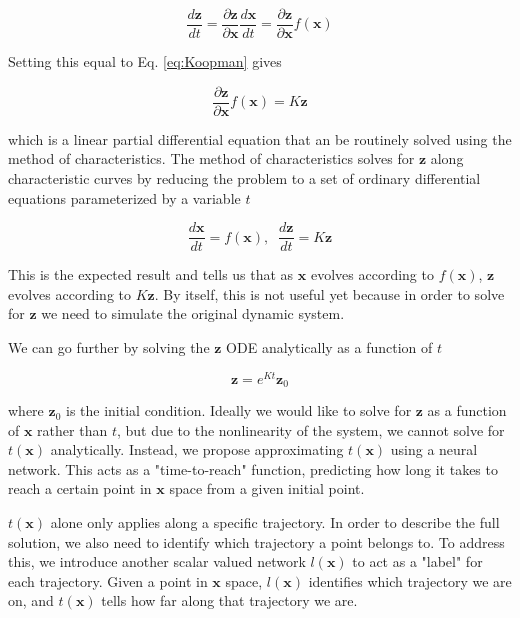 \documentclass[12pt, letterpaper]{article}
\begin{document}
\begin{equation}
    \frac{d \mathbf{z}}{dt} = \frac{\partial \mathbf{z}}{\partial \mathbf{x}} \frac{d \mathbf{x}}{dt} = \frac{\partial \mathbf{z}}{\partial \mathbf{x}} f(\mathbf{x})
\end{equation}

Setting this equal to Eq. \ref{eq:Koopman} gives

\begin{equation}
    \frac{\partial \mathbf{z}}{\partial \mathbf{x}} f(\mathbf{x}) = K \mathbf{z}
\end{equation}

which is a linear partial differential equation that an be routinely solved using the method of characteristics.  The method of characteristics solves for $\mathbf{z}$ along characteristic curves by reducing the problem to a set of ordinary differential equations parameterized by a variable $t$

\begin{equation}
    \frac{d\mathbf{x}}{dt} = f(\mathbf{x}), \; \;
    \frac{d\mathbf{z}}{dt} = K \mathbf{z}
\end{equation}

This is the expected result and tells us that as $\mathbf{x}$ evolves according to $f(\mathbf{x})$, $\mathbf{z}$ evolves according to $K \mathbf{z}$.  By itself, this is not useful yet because in order to solve for $\mathbf{z}$ we need to simulate the original dynamic system.

We can go further by solving the $\mathbf{z}$ ODE analytically as a function of $t$

\begin{equation}
    \mathbf{z} = e^{Kt}\mathbf{z}_0
\end{equation}

where $\mathbf{z}_0$ is the initial condition.  Ideally we would like to solve for $\mathbf{z}$ as a function of $\mathbf{x}$ rather than $t$, but due to the nonlinearity of the system, we cannot solve for $t(\mathbf{x})$ analytically.  Instead, we propose approximating $t(\mathbf{x})$ using a neural network.  This acts as a "time-to-reach" function, predicting how long it takes to reach a certain point in $\mathbf{x}$ space from a given initial point.

$t(\mathbf{x})$ alone only applies along a specific trajectory.  In order to describe the full solution, we also need to identify which trajectory a point belongs to.  To address this, we introduce another scalar valued network $l(\mathbf{x})$ to act as a "label" for each trajectory.  Given a point in $\mathbf{x}$ space, $l(\mathbf{x})$ identifies which trajectory we are on, and $t(\mathbf{x})$ tells how far along that trajectory we are.
\end{document}
